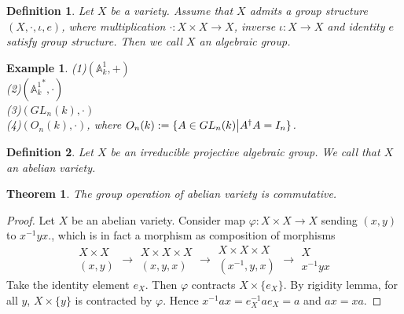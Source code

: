 \documentclass{ctexart}
\newtheorem{definition}{Definition}[section]
\newtheorem{theorem}{Theorem}[section]
\newtheorem{example}{Example}[section]
\begin{document}
\begin{definition}
    Let $X$ be a variety.
    Assume that $X$ admits a group structure $(X, \cdot, \iota, e)$,
    where multiplication $\cdot: X \times X \rightarrow X$, inverse $\iota: X \rightarrow X$ and identity $e$ satisfy group structure.
    Then we call $X$ an algebraic group.
\end{definition}
\begin{example}
    (1)$(\mathbb{A}_{k}^{1}, +)$ \\
    (2)$({\mathbb{A}_{k}^{1}}^{\ast}, \cdot)$ \\
    (3)$(GL_{n}(k), \cdot)$ \\
    (4)$(O_{n}(k), \cdot)$, where $O_{n}(k) := \{A\in GL_{n}(k) \big{|} A^{\dagger}A = I_{n}\}$.
\end{example}
\begin{definition}
    Let $X$ be an irreducible projective algebraic group.
    We call that $X$ an abelian variety.
\end{definition}
\begin{theorem}
    The group operation of abelian variety is commutative.
    \label{Theorem 4.7}
\end{theorem}
\begin{proof}
    Let $X$ be an abelian variety.
    Consider map $\varphi: X \times X \rightarrow X$ sending $(x, y)$ to $x^{-1}yx$.,
    which is in fact a morphism as composition of morphisms
    \begin{equation}
        \begin{gathered}
            X \times X \\
            (x, y)
        \end{gathered}
        \rightarrow
        \begin{gathered}
            X \times X \times X \\
            (x, y, x)
        \end{gathered}
        \rightarrow
        \begin{gathered}
            X \times X \times X \\
            (x^{-1}, y, x)
        \end{gathered}
        \rightarrow
        \begin{gathered}
            X \\
            x^{-1}yx
        \end{gathered}
    \end{equation}
    Take the identity element $e_{X}$.
    Then $\varphi$ contracts $X \times \{e_{X}\}$.
    By rigidity lemma, for all $y$, $X \times \{y\}$ is contracted by $\varphi$.
    Hence $x^{-1}ax = e_{X}^{-1}ae_{X} = a$ and $ax = xa$.
\end{proof}
\end{document}
